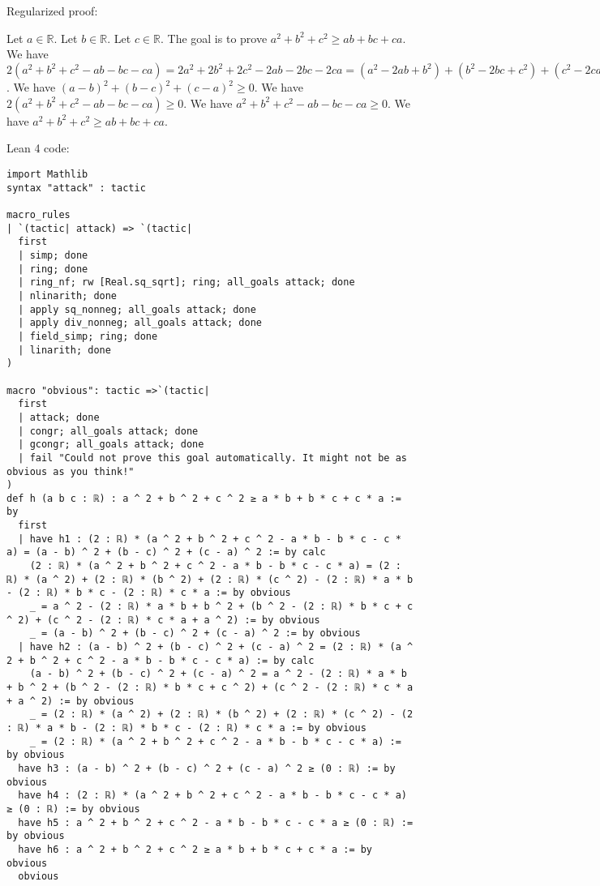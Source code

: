 \documentclass{article}
\begin{document}
Regularized proof:
\begin{tcolorbox}[colback=red!10, width=\linewidth]
Let $a\in\mathbb{R}$.
Let $b\in\mathbb{R}$.
Let $c\in\mathbb{R}$.
The goal is to prove $a^2 + b^2 + c^2 \geq ab + bc + ca$.
We have $2(a^2 + b^2 + c^2 - ab - bc - ca) = 2a^2 + 2b^2 + 2c^2 - 2ab - 2bc - 2ca = (a^2 - 2ab + b^2) + (b^2 - 2bc + c^2) + (c^2 - 2ca + a^2) = {(a-b)}^2 + {(b-c)}^2 + {(c-a)}^2$.
We have ${(a-b)}^2 + {(b-c)}^2 + {(c-a)}^2 \ge 0$.
We have $2(a^2 + b^2 + c^2 - ab - bc - ca) \ge 0$.
We have $a^2 + b^2 + c^2 - ab - bc - ca \ge 0$.
We have $a^2 + b^2 + c^2 \geq ab + bc + ca$.
\end{tcolorbox}

Lean 4 code:
\begin{tcolorbox}[colback=white!10, width=\linewidth]
\begin{lstlisting}[language=Lean4]
import Mathlib
syntax "attack" : tactic

macro_rules
| `(tactic| attack) => `(tactic|
  first
  | simp; done
  | ring; done
  | ring_nf; rw [Real.sq_sqrt]; ring; all_goals attack; done
  | nlinarith; done
  | apply sq_nonneg; all_goals attack; done
  | apply div_nonneg; all_goals attack; done
  | field_simp; ring; done
  | linarith; done
)

macro "obvious": tactic =>`(tactic|
  first
  | attack; done
  | congr; all_goals attack; done
  | gcongr; all_goals attack; done
  | fail "Could not prove this goal automatically. It might not be as obvious as you think!"
)
def h (a b c : ℝ) : a ^ 2 + b ^ 2 + c ^ 2 ≥ a * b + b * c + c * a := by
  first
  | have h1 : (2 : ℝ) * (a ^ 2 + b ^ 2 + c ^ 2 - a * b - b * c - c * a) = (a - b) ^ 2 + (b - c) ^ 2 + (c - a) ^ 2 := by calc
    (2 : ℝ) * (a ^ 2 + b ^ 2 + c ^ 2 - a * b - b * c - c * a) = (2 : ℝ) * (a ^ 2) + (2 : ℝ) * (b ^ 2) + (2 : ℝ) * (c ^ 2) - (2 : ℝ) * a * b - (2 : ℝ) * b * c - (2 : ℝ) * c * a := by obvious
    _ = a ^ 2 - (2 : ℝ) * a * b + b ^ 2 + (b ^ 2 - (2 : ℝ) * b * c + c ^ 2) + (c ^ 2 - (2 : ℝ) * c * a + a ^ 2) := by obvious
    _ = (a - b) ^ 2 + (b - c) ^ 2 + (c - a) ^ 2 := by obvious
  | have h2 : (a - b) ^ 2 + (b - c) ^ 2 + (c - a) ^ 2 = (2 : ℝ) * (a ^ 2 + b ^ 2 + c ^ 2 - a * b - b * c - c * a) := by calc
    (a - b) ^ 2 + (b - c) ^ 2 + (c - a) ^ 2 = a ^ 2 - (2 : ℝ) * a * b + b ^ 2 + (b ^ 2 - (2 : ℝ) * b * c + c ^ 2) + (c ^ 2 - (2 : ℝ) * c * a + a ^ 2) := by obvious
    _ = (2 : ℝ) * (a ^ 2) + (2 : ℝ) * (b ^ 2) + (2 : ℝ) * (c ^ 2) - (2 : ℝ) * a * b - (2 : ℝ) * b * c - (2 : ℝ) * c * a := by obvious
    _ = (2 : ℝ) * (a ^ 2 + b ^ 2 + c ^ 2 - a * b - b * c - c * a) := by obvious
  have h3 : (a - b) ^ 2 + (b - c) ^ 2 + (c - a) ^ 2 ≥ (0 : ℝ) := by obvious
  have h4 : (2 : ℝ) * (a ^ 2 + b ^ 2 + c ^ 2 - a * b - b * c - c * a) ≥ (0 : ℝ) := by obvious
  have h5 : a ^ 2 + b ^ 2 + c ^ 2 - a * b - b * c - c * a ≥ (0 : ℝ) := by obvious
  have h6 : a ^ 2 + b ^ 2 + c ^ 2 ≥ a * b + b * c + c * a := by obvious
  obvious

\end{lstlisting}
\end{tcolorbox}
\end{document}
